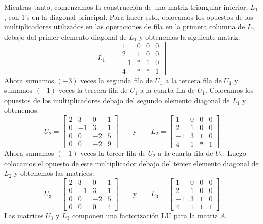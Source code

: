 Mientras tanto, comenzamos la construcción de una matriz triangular inferior, \(L_1\), con 1's en la diagonal principal. Para hacer esto, colocamos los opuestos de los multiplicadores utilizados en las operaciones de fila en la primera columna de \(L_1\) debajo del primer elemento diagonal de \(L_1\) y obtenemos la siguiente matriz:
\[
L_1 = \begin{bmatrix}
1 & 0 & 0 & 0 \\
2 & 1 & 0 & 0 \\
-1 & * & 1 & 0 \\
4 & * & * & 1
\end{bmatrix}
\]
Ahora sumamos \((-3)\) veces la segunda fila de \(U_1\) a la tercera fila de \(U_1\) y sumamos \((-1)\) veces la tercera fila de \(U_1\) a la cuarta fila de \(U_1\). Colocamos los opuestos de los multiplicadores debajo del segundo elemento diagonal de \(L_1\) y obtenemos:
\[
U_2 = \begin{bmatrix}
  2 & 3 & 0 & 1 \\
  0 & -1 & 3 & 1 \\
  0 & 0 & -2 & 5 \\
  0 & 0 & -2 & 9
\end{bmatrix} \qquad \text{y} \qquad L_2 = \begin{bmatrix}
  1 & 0 & 0 & 0 \\
  2 & 1 & 0 & 0 \\
  -1 & 3 & 1 & 0 \\
  4 & 1 & * & 1
\end{bmatrix}
\]
Ahora sumamos \((-1)\) veces la tercer fila de \(U_2\) a la cuarta fila de \(U_2\). Luego colocamos el opuesto de este multiplicador debajo del tercer elemento diagonal de \(L_2\) y obtenemos las matrices:
\[
U_3 = \begin{bmatrix}
  2 & 3 & 0 & 1 \\
  0 & -1 & 3 & 1 \\
  0 & 0 & -2 & 5 \\
  0 & 0 & 0 & 4
\end{bmatrix} \qquad \text{y} \qquad L_3 = \begin{bmatrix}
  1 & 0 & 0 & 0 \\
  2 & 1 & 0 & 0 \\
  -1 & 3 & 1 & 0 \\
  4 & 1 & 1 & 1
\end{bmatrix}
\]
Las matrices \(U_3\) y \(L_3\) componen una factorización LU para la matriz \(A\).